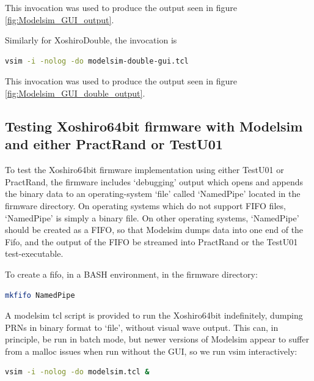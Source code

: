 \documentclass{article}
\begin{document}
This invocation was used to produce the output seen in figure \ref{fig:Modelsim_GUI_output}. 

Similarly for XoshiroDouble, the invocation is

\begin{minipage}{1.0\textwidth}
\centering
\begin{lstlisting}[language=bash , label=lst:ModelsimDoubleGui]
vsim -i -nolog -do modelsim-double-gui.tcl
\end{lstlisting}
\end{minipage}

This invocation was used to produce the output seen in figure \ref{fig:Modelsim_GUI_double_output}. 

\subsection{Testing Xoshiro64bit firmware with Modelsim and either PractRand or TestU01}

To test the Xoshiro64bit firmware implementation using either TestU01 or PractRand, the firmware includes `debugging' output which opens and appends the binary data to an operating-system `file' called `NamedPipe' located in the firmware directory. On operating systems which do not support FIFO files, `NamedPipe' is simply a binary file. On other operating systems, `NamedPipe' should be created as a FIFO, so that Modelsim dumps data into one end of the Fifo, and the output of the FIFO be streamed into PractRand or the TestU01 test-executable.

To create a fifo, in a BASH environment, in the firmware directory:

\begin{minipage}{1.0\textwidth}
\centering
\begin{lstlisting}[language=bash, label=lst:MakeFifo]
mkfifo NamedPipe
\end{lstlisting}
\end{minipage}

A modelsim tcl script is provided to run the Xoshiro64bit indefinitely, dumping PRNs in binary format to `file', without visual wave output. This can, in principle, be run in batch mode, but newer versions of Modelsim appear to suffer from a malloc issues when run without the GUI, so we run vsim interactively:

\begin{minipage}{1.0\textwidth}
\centering
\begin{lstlisting}[language=bash, label=lst:ModelsimNoGui]
vsim -i -nolog -do modelsim.tcl &
\end{lstlisting}
\end{minipage}
\end{document}
